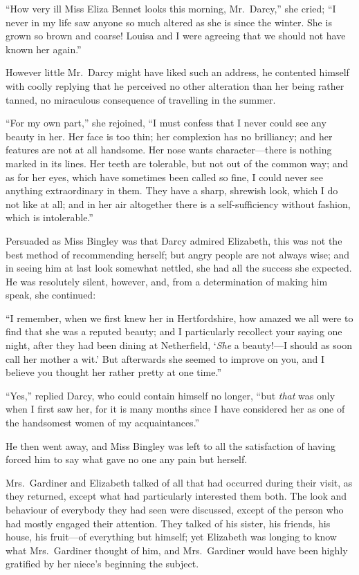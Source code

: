 \documentclass[12pt,english]{book}
\begin{document}
{}``How very ill Miss Eliza Bennet looks this morning, Mr.\ Darcy,''
she cried; {}``I never in my life saw anyone so much altered as she
is since the winter. She is grown so brown and coarse! Louisa and
I were agreeing that we should not have known her again.''

However little Mr.\ Darcy might have liked such an address, he contented
himself with coolly replying that he perceived no other alteration
than her being rather tanned, no miraculous consequence of travelling
in the summer.

{}``For my own part,'' she rejoined, {}``I must confess that I
never could see any beauty in her. Her face is too thin; her complexion
has no brilliancy; and her features are not at all handsome. Her nose
wants character\mbox{---}there is nothing marked in its lines. Her
teeth are tolerable, but not out of the common way; and as for her
eyes, which have sometimes been called so fine, I could never see
anything extraordinary in them. They have a sharp, shrewish look,
which I do not like at all; and in her air altogether there is a self-sufficiency
without fashion, which is intolerable.''

Persuaded as Miss Bingley was that Darcy admired Elizabeth, this was
not the best method of recommending herself; but angry people are
not always wise; and in seeing him at last look somewhat nettled,
she had all the success she expected. He was resolutely silent, however,
and, from a determination of making him speak, she continued:

{}``I remember, when we first knew her in Hertfordshire, how amazed
we all were to find that she was a reputed beauty; and I particularly
recollect your saying one night, after they had been dining at Netherfield,
`\textit{She} a beauty!\mbox{---}I should as soon call her mother
a wit.' But afterwards she seemed to improve on you, and I believe
you thought her rather pretty at one time.''

{}``Yes,'' replied Darcy, who could contain himself no longer, {}``but
\textit{that} was only when I first saw her, for it is many months
since I have considered her as one of the handsomest women of my acquaintances.''

He then went away, and Miss Bingley was left to all the satisfaction
of having forced him to say what gave no one any pain but herself.

Mrs.\ Gardiner and Elizabeth talked of all that had occurred during
their visit, as they returned, except what had particularly interested
them both. The look and behaviour of everybody they had seen were
discussed, except of the person who had mostly engaged their attention.
They talked of his sister, his friends, his house, his fruit\mbox{---}of
everything but himself; yet Elizabeth was longing to know what Mrs.\ Gardiner
thought of him, and Mrs.\ Gardiner would have been highly gratified
by her niece's beginning the subject.
\end{document}
